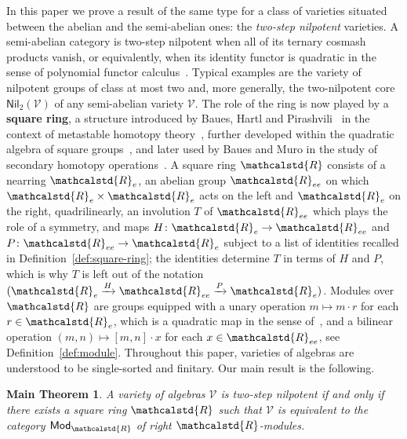 \documentclass[reqno,a4paper]{amsart}
\theoremstyle{plain}
\newtheorem*{maintheorem}{Main Theorem}
\theoremstyle{definition}
\newcommand{\defn}{\textbf}
\newcommand{\V}{\ensuremath{\mathcal{V}}}
\newcommand{\R}{\ensuremath{\mathcalstd{R}}}
\newcommand{\Mod}{\ensuremath{\mathsf{Mod}}}
\newcommand{\Nil}{\ensuremath{\mathsf{Nil}}}
\newcommand{\sqring}[4]{\ensuremath{(#1\xrightarrow{#3}#2\xrightarrow{#4}#1)}}
\renewcommand{\Re}{\ensuremath{\R_{e}}}
\newcommand{\Ree}{\ensuremath{\R_{ee}}}
\newcommand{\brk}[2]{\ensuremath{[#1,#2]}}
\begin{document}
In this paper we prove a result of the same type for a class of varieties situated between the abelian and the semi-abelian ones: the \emph{two-step nilpotent} varieties. A semi-abelian category is two-step nilpotent when all of its ternary cosmash products vanish, or equivalently, when its identity functor is quadratic in the sense of polynomial functor calculus~\cite{Hartl-Vespa, HVdL, DHVdL}. Typical examples are the variety of nilpotent groups of class at most two and, more generally, the two-nilpotent core \(\Nil_{2}(\V)\) of any semi-abelian variety \(\V\). The role of the ring is now played by a \defn{square ring}, a structure introduced by Baues, Hartl and Pirashvili~\cite{BHP} in the context of metastable homotopy theory~\cite{Baues:Metastable}, further developed within the quadratic algebra of square groups~\cite{Baues-Pirashvili, Baues-Pirashvili:Spaces, BJP:SquareGroups}, and later used by Baues and Muro in the study of secondary homotopy operations~\cite{Baues-Muro, Baues-Muro:Smash, Baues-Muro:RingSpectra}. A square ring \(\R\) consists of a nearring \(\Re\), an abelian group \(\Ree\) on which \(\Re\times\Re\) acts on the left and \(\Re\) on the right, quadrilinearly, an involution \(T\) of \(\Ree\) which plays the role of a symmetry, and maps \(H\colon \Re\to\Ree\) and \(P\colon \Ree\to\Re\) subject to a list of identities recalled in Definition~\ref{def:square-ring}; the identities determine \(T\) in terms of \(H\) and \(P\), which is why \(T\) is left out of the notation \(\sqring{\Re}{\Ree}{H}{P}\). Modules over \(\R\) are groups equipped with a unary operation \(m\mapsto m\cdot r\) for each \(r\in\Re\), which is a quadratic map in the sense of~\cite{Passi:GroupRings, Hartl:QuadraticMaps}, and a bilinear operation \((m,n)\mapsto\brk{m}{n}\cdot x\) for each \(x\in\Ree\), see Definition~\ref{def:module}. Throughout this paper, varieties of algebras are understood to be single-sorted and finitary. Our main result is the following.

\begin{maintheorem}
  A variety of algebras \(\V\) is two-step nilpotent if and only if there exists a square ring \(\R\) such that \(\V\) is equivalent to the category \(\Mod_{\R}\) of right \(\R\)-modules.
\end{maintheorem}
\end{document}
